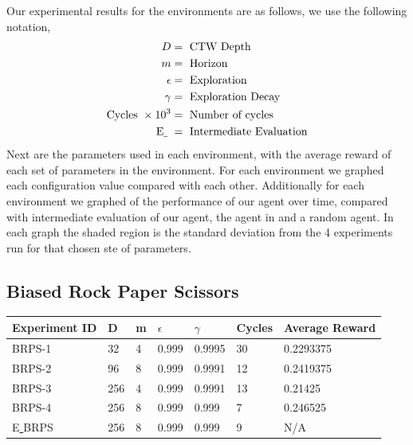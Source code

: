 \documentclass{article}
\theoremstyle{definition}
\newtheorem{primary statistics}[definition]{Primary Statistics}
\newtheorem{auxiliary statistics}[definition]{Auxiliary Statistics}
\begin{document}
Our experimental results for the environments are as follows, we use the following notation,
 \begin{align*}
     D &= \text{ CTW Depth} \\
     m &= \text{ Horizon} \\
     \epsilon &= \text{ Exploration} \\
     \gamma &= \text{ Exploration Decay} \\
     \text{Cycles }\times 10^3 &= \text{ Number of cycles }  \\
     \text{E\underline{ } } &= \text{ Intermediate Evaluation}
 \end{align*}
Next are the parameters used in each environment, with the average reward of each set of parameters in the environment. For each environment we graphed each configuration value compared with each other. Additionally for each environment we graphed of the performance of our agent over time, compared with intermediate evaluation of our agent, the agent in \citep{veness2011monte} and a random agent. In each graph the shaded region is the standard deviation from the 4 experiments run for that chosen ste of parameters.



\newpage

\subsection{Biased Rock Paper Scissors}
\begin{tabular}{|l|l|l|l|l|l|l|}
\hline \centering
 Experiment ID& D & m & $\epsilon$ & $\gamma$ & Cycles & Average Reward \\ \hline
BRPS-1        & 32        & 4           & 0.999       & 0.9995            & 30     & 0.2293375        \\ \hline
BRPS-2        & 96        & 8           & 0.999       & 0.9991            & 12     & 0.2419375       \\ \hline
BRPS-3        & 256       & 4           & 0.999       & 0.9991            & 13     & 0.21425        \\ \hline
BRPS-4        & 256       & 8           & 0.999       & 0.999             & 7      & 0.246525  \\ \hline  
E\underline{ }BRPS        & 256       & 8           & 0.999       & 0.999             & 9      & N/A  \\ \hline      
\end{tabular} 
\end{document}

